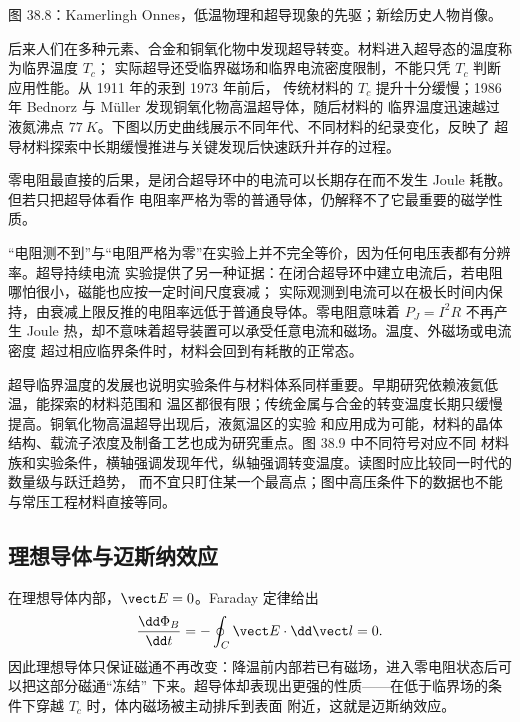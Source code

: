 %
{图 38.8：Kamerlingh Onnes，低温物理和超导现象的先驱；新绘历史人物肖像。}

后来人们在多种元素、合金和铜氧化物中发现超导转变。材料进入超导态的温度称为临界温度 $T_c$；
实际超导还受临界磁场和临界电流密度限制，不能只凭 $T_c$ 判断应用性能。从 1911 年的汞到 1973 年前后，
传统材料的 $T_c$ 提升十分缓慢；1986 年 Bednorz 与 M\"uller 发现铜氧化物高温超导体，随后材料的
临界温度迅速越过液氮沸点 $\SI{77}{K}$。下图以历史曲线展示不同年代、不同材料的纪录变化，反映了
超导材料探索中长期缓慢推进与关键发现后快速跃升并存的过程。

\superconductivityTimeline

\superconductivityChartFaithful

零电阻最直接的后果，是闭合超导环中的电流可以长期存在而不发生 Joule 耗散。但若只把超导体看作
电阻率严格为零的普通导体，仍解释不了它最重要的磁学性质。

“电阻测不到”与“电阻严格为零”在实验上并不完全等价，因为任何电压表都有分辨率。超导持续电流
实验提供了另一种证据：在闭合超导环中建立电流后，若电阻哪怕很小，磁能也应按一定时间尺度衰减；
实际观测到电流可以在极长时间内保持，由衰减上限反推的电阻率远低于普通良导体。零电阻意味着
$P_J=I^2R$ 不再产生 Joule 热，却不意味着超导装置可以承受任意电流和磁场。温度、外磁场或电流密度
超过相应临界条件时，材料会回到有耗散的正常态。

超导临界温度的发展也说明实验条件与材料体系同样重要。早期研究依赖液氦低温，能探索的材料范围和
温区都很有限；传统金属与合金的转变温度长期只缓慢提高。铜氧化物高温超导出现后，液氮温区的实验
和应用成为可能，材料的晶体结构、载流子浓度及制备工艺也成为研究重点。图 38.9 中不同符号对应不同
材料族和实验条件，横轴强调发现年代，纵轴强调转变温度。读图时应比较同一时代的数量级与跃迁趋势，
而不宜只盯住某一个最高点；图中高压条件下的数据也不能与常压工程材料直接等同。

\subsection*{理想导体与迈斯纳效应}

在理想导体内部，$\vect E=0$。Faraday 定律给出
\begin{equation}
  \frac{\dd\Phi_B}{\dd t}=-\oint_C\vect E\cdot\dd\vect l=0.
\end{equation}
因此理想导体只保证磁通不再改变：降温前内部若已有磁场，进入零电阻状态后可以把这部分磁通“冻结”
下来。超导体却表现出更强的性质——在低于临界场的条件下穿越 $T_c$ 时，体内磁场被主动排斥到表面
附近，这就是迈斯纳效应。

